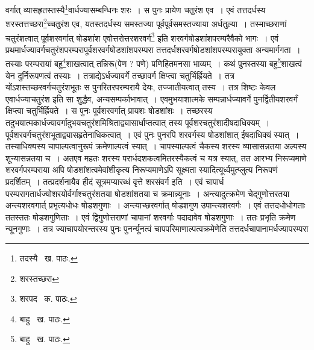 \documentclass[11pt, openany]{book}
\begin{document}
\noindent वर्गात् व्यासहृतस्तस्यै\renewcommand{\thefootnote}{१}\footnote{तदस्यै \textendash\ ख. पाठः.}वार्धज्यासम्बन्धिनः शरः~। स पुनः प्रायेण चतुरंश एव~। एवं तत्तदर्धस्य शरस्तत्तच्छरा\renewcommand{\thefootnote}{२}\footnote{शरस्तच्छरा}च्चतुरंश एव, यतस्तदर्धस्य समस्तज्या पूर्वपूर्वसमस्तज्याया अर्धतुल्या~। तस्माच्छराणां चतुरंशत्वात् पूर्वशरवर्गात् षोडशांश एवोत्तरोत्तरशरवर्ग\renewcommand{\thefootnote}{३}\footnote{शरपद \textendash\ क. पाठः.} इति शरवर्गषोडशांशपरम्परैवैको भागः~। एवं प्रथमार्धज्यावर्गचतुरंशपरम्परापूर्वशरवर्गषोडशांशपरम्परा तत्तदर्धशरवर्गषोडशांशपरम्परायुक्ता अन्यमार्गगता~। तस्याः परम्परायां बहु\renewcommand{\thefootnote}{४}\footnote{बाहु \textendash\ ख. पाठः.}शाखत्वात् तन्निरू(पेण ? पणे) प्रणिहितमनसा भाव्यम्~। कथं पुनस्तस्या बहु\renewcommand{\thefootnote}{५}\footnote{बाहु \textendash\ ख. पाठः.}शाखत्वं येन दुर्निरूपणत्वं तस्याः~। तत्राद्येऽर्धज्यावर्गे तच्छावर्ग क्षिप्त्वा चतुर्भिर्ह्रियते~। तत्र योंऽशस्तच्छरवर्गचतुरंशभूतः स पुनरितरपरम्परायै देयः, तज्जातीयत्वात् तस्य~। तत्र शिष्टः केवल एवार्धज्याचतुरंश इति सा शुद्धैव, अन्यसम्पर्काभावात्~। एवमुभयाशात्मके सम्पन्नार्धज्यावर्गे पुनर्द्वितीयशरवर्गं क्षिप्त्वा चतुर्भिर्ह्रियते~। स पुनः पूर्वशरवर्गात् प्रायशः षोडशांशः~। तच्छरस्य तदुभयात्मकार्धज्यावर्गादुभयचतुरंशमिश्रिताद्व्यासार्धाप्तत्वात् तस्य पूर्वशरचतुरंशादीषदाधिक्यम्~।
पूर्वशरवर्गचतुरंशभूताद्व्यासहृतेनाधिकत्वात्~। एवं पुनः पुनरपि शरवर्गस्य षोडशांशात् ईषदाधिक्यं स्यात्~। तस्याधिक्यस्य चापाल्पत्वानुरूपं
क्रमेणाल्पत्वं स्यात्~। चापस्याल्पत्वं चैकस्य शरस्य व्यासासन्नतया अल्पस्य शून्यासन्नतया च~। अतएव महतः शरस्य परार्धदशकत्वमितरस्यैकत्वं च यत्र स्यात्, तत आरभ्य निरूप्यमाणे शरवर्गपरम्पराया अपि षोडशांशत्वमेवांशीकृत्य निरूप्यमाणेऽपि सूक्ष्मता स्यादित्यूर्ध्वमुत्प्लुत्य निरूपणं
प्रदर्शितम्~। तत्प्रदर्शनायैव हीदं सूत्रमप्यारब्धं {\qt वृत्ते शरसंवर्ग} इति~। एवं चापार्ध परम्परागतार्धज्योशरयोर्वर्गाश्चतुरंशतया षोडशांशतया च क्रमान्न्यूनाः~। अन्त्यादुत्क्रमेण चेद्गुणोत्तरतया अन्त्यशरवगार्त् प्रभृत्यधोधः षोडशगुणाः~। अन्त्याच्छरवर्गात् षोडशगुण उपान्त्यशरवर्गः~। एवं तत्तदधोधोगताः ततस्ततः षोडशगुणिताः~। एवं द्विगुणोत्तराणां चापानां शरवर्गाः पदादावेव षोडशगुणाः~। ततः प्रभृति क्रमेण न्यूनगुणाः~। तत्र ज्याचापयोरन्तरस्य पुनः पुनर्न्यूनत्वं चापपरिमाणाल्पत्वक्रमेणेति तत्तदर्धचापानामर्धज्यापरम्परा

\newpage
\end{document}
